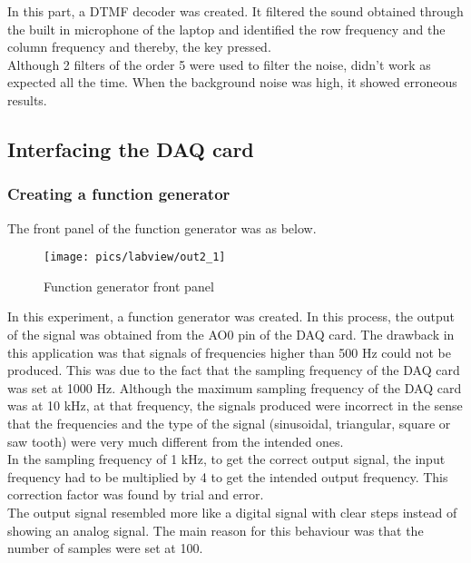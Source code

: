 \noindent
In this part, a DTMF decoder was created. It filtered the sound obtained through the built in  microphone of the laptop and identified the row frequency and the column frequency and thereby, the key pressed. \\

\noindent
Although 2 filters of the order 5 were used to filter the noise, didn't work as expected all the time. When the background noise was high, it showed erroneous results.

\pagebreak

\subsection{Interfacing the DAQ card}

\subsubsection{Creating a function generator}

\noindent
The front panel of the function generator was as below.

\begin{figure}[!h]
	\centering
	\texttt{[image: pics/labview/out2\_1]}
	\caption{Function generator front panel}
	\label{fig:out21}
\end{figure}

\noindent
In this experiment, a function generator was created. In this process, the output of the signal was obtained from the AO0 pin of the DAQ card. The drawback in this application was that signals of frequencies higher than 500 Hz could not be produced. This was due to the fact that the sampling frequency of the DAQ card was set at 1000 Hz. Although the maximum sampling frequency of the DAQ card was at 10 kHz, at that frequency, the signals produced were incorrect in the sense that the frequencies and the  type of the signal (sinusoidal, triangular, square or saw tooth) were very much different from the intended ones. \\

\noindent
In the sampling frequency of 1 kHz, to get the correct output signal, the input frequency had to be multiplied by 4 to get the intended output frequency. This correction factor was found by trial and error.\\

\noindent
The output signal resembled more like a digital signal with clear steps instead of showing an analog signal. The main reason for this behaviour was that the number of samples were set at 100.\\


